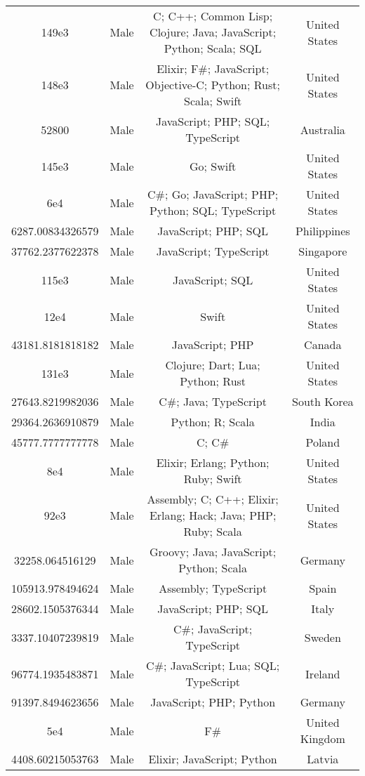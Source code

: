 \begin{center}
\begin{tabular}{ |c|c|c|c| }
149e3  &  Male  &  C; C++; Common Lisp; Clojure; Java; JavaScript; Python; Scala; SQL  &  United States  \\ 
148e3  &  Male  &  Elixir; F\#; JavaScript; Objective-C; Python; Rust; Scala; Swift  &  United States  \\ 
52800  &  Male  &  JavaScript; PHP; SQL; TypeScript  &  Australia  \\ 
145e3  &  Male  &  Go; Swift  &  United States  \\ 
6e4  &  Male  &  C\#; Go; JavaScript; PHP; Python; SQL; TypeScript  &  United States  \\ 
6287.00834326579  &  Male  &  JavaScript; PHP; SQL  &  Philippines  \\ 
37762.2377622378  &  Male  &  JavaScript; TypeScript  &  Singapore  \\ 
115e3  &  Male  &  JavaScript; SQL  &  United States  \\ 
12e4  &  Male  &  Swift  &  United States  \\ 
43181.8181818182  &  Male  &  JavaScript; PHP  &  Canada  \\ 
131e3  &  Male  &  Clojure; Dart; Lua; Python; Rust  &  United States  \\ 
27643.8219982036  &  Male  &  C\#; Java; TypeScript  &  South Korea  \\ 
29364.2636910879  &  Male  &  Python; R; Scala  &  India  \\ 
45777.7777777778  &  Male  &  C; C\#  &  Poland  \\ 
8e4  &  Male  &  Elixir; Erlang; Python; Ruby; Swift  &  United States  \\ 
92e3  &  Male  &  Assembly; C; C++; Elixir; Erlang; Hack; Java; PHP; Ruby; Scala  &  United States  \\ 
32258.064516129  &  Male  &  Groovy; Java; JavaScript; Python; Scala  &  Germany  \\ 
105913.978494624  &  Male  &  Assembly; TypeScript  &  Spain  \\ 
28602.1505376344  &  Male  &  JavaScript; PHP; SQL  &  Italy  \\ 
3337.10407239819  &  Male  &  C\#; JavaScript; TypeScript  &  Sweden  \\ 
96774.1935483871  &  Male  &  C\#; JavaScript; Lua; SQL; TypeScript  &  Ireland  \\ 
91397.8494623656  &  Male  &  JavaScript; PHP; Python  &  Germany  \\ 
5e4  &  Male  &  F\#  &  United Kingdom  \\ 
4408.60215053763  &  Male  &  Elixir; JavaScript; Python  &  Latvia  \\ 

\end{tabular}
\end{center}

